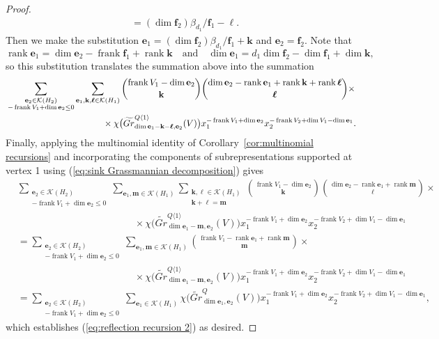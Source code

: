 \documentclass{amsart}
\numberwithin{equation}{section}
\theoremstyle{definition}
\def\bfe{\mathbf{e}}
\def\bff{\mathbf{f}}
\def\bfk{\mathbf{k}}
\def\bfl{{\ensuremath{\boldsymbol\ell}}}
\def\bfm{\mathbf{m}}
\def\cK{\mathcal{K}}
\def\dim{\operatorname{dim}}
\def\frank{\operatorname{frank}}
\def\rank{\operatorname{rank}}
\renewcommand{\eqref}[1]{{\rm (\ref{#1})}}
\begin{document}
\begin{proof}
\begin{align*}
    &=(\dim\bff_2)\beta_{d_1}/\bff_1-\bfl.
  \end{align*}
  Then we make the substitution $\bfe_1=(\dim\bff_2)\beta_{d_1}/\bff_1+\bfk$ and $\bfe_2=\bff_2$.  Note that 
  \[\rank\bfe_1=\dim\bfe_2-\frank\bff_1+\rank\bfk\quad\text{and}\quad\dim\bfe_1=d_1\dim\bff_2-\dim\bff_1+\dim\bfk,\]
  so this substitution translates the summation above into the summation
  \begin{align*}
    &\sum\limits_{\substack{\bfe_2\in\cK(H_2)\\-\frank V_1+\dim\bfe_2\le0}}\sum\limits_{\bfe_1,\bfk,\bfl\in\cK(H_1)}{\frank V_1-\dim\bfe_2\choose\bfk}{\dim\bfe_2-\rank\bfe_1+\rank\bfk+\rank\bfl\choose\bfl}\times\\
    &\hspace{1.5in}\times\chi\big(\widetilde{Gr}^{Q\langle 1\rangle}_{\dim\bfe_1-\bfk-\bfl,\bfe_2}(V)\big) x_1^{-\frank V_1+\dim\bfe_2}x_2^{-\frank V_2+\dim V_1-\dim\bfe_1}.
  \end{align*}
  Finally, applying the multinomial identity of Corollary~\ref{cor:multinomial recursions} and incorporating the components of subrepresentations supported at vertex 1 using \eqref{eq:sink Grassmannian decomposition} gives
  \begin{align*}
    &\sum\limits_{\substack{\bfe_2\in\cK(H_2)\\-\frank V_1+\dim\bfe_2\le0}}\sum\limits_{\bfe_1,\bfm\in\cK(H_1)}\sum\limits_{\substack{\bfk,\bfl\in\cK(H_1)\\\bfk+\bfl=\bfm}}{\frank V_1-\dim\bfe_2\choose\bfk}{\dim\bfe_2-\rank\bfe_1+\rank\bfm\choose\bfl}\times\\
    &\hspace{2in}\times\chi\big(\widetilde{Gr}^{Q\langle 1\rangle}_{\dim\bfe_1-\bfm,\bfe_2}(V)\big) x_1^{-\frank V_1+\dim\bfe_2}x_2^{-\frank V_2+\dim V_1-\dim\bfe_1}\\
    &=\sum\limits_{\substack{\bfe_2\in\cK(H_2)\\-\frank V_1+\dim\bfe_2\le0}}\sum\limits_{\bfe_1,\bfm\in\cK(H_1)}{\frank V_1-\rank\bfe_1+\rank\bfm\choose\bfm}\times\\
    &\hspace{2in}\times\chi\big(\widetilde{Gr}^{Q\langle 1\rangle}_{\dim\bfe_1-\bfm,\bfe_2}(V)\big) x_1^{-\frank V_1+\dim\bfe_2}x_2^{-\frank V_2+\dim V_1-\dim\bfe_1}\\
    &=\sum\limits_{\substack{\bfe_2\in\cK(H_2)\\-\frank V_1+\dim\bfe_2\le0}}\sum\limits_{\bfe_1\in\cK(H_1)}\chi\big(\widetilde{Gr}^Q_{\dim\bfe_1,\bfe_2}(V)\big) x_1^{-\frank V_1+\dim\bfe_2}x_2^{-\frank V_2+\dim V_1-\dim\bfe_1},
  \end{align*}
  which establishes \eqref{eq:reflection recursion 2} as desired.
\end{proof}
\end{document}
